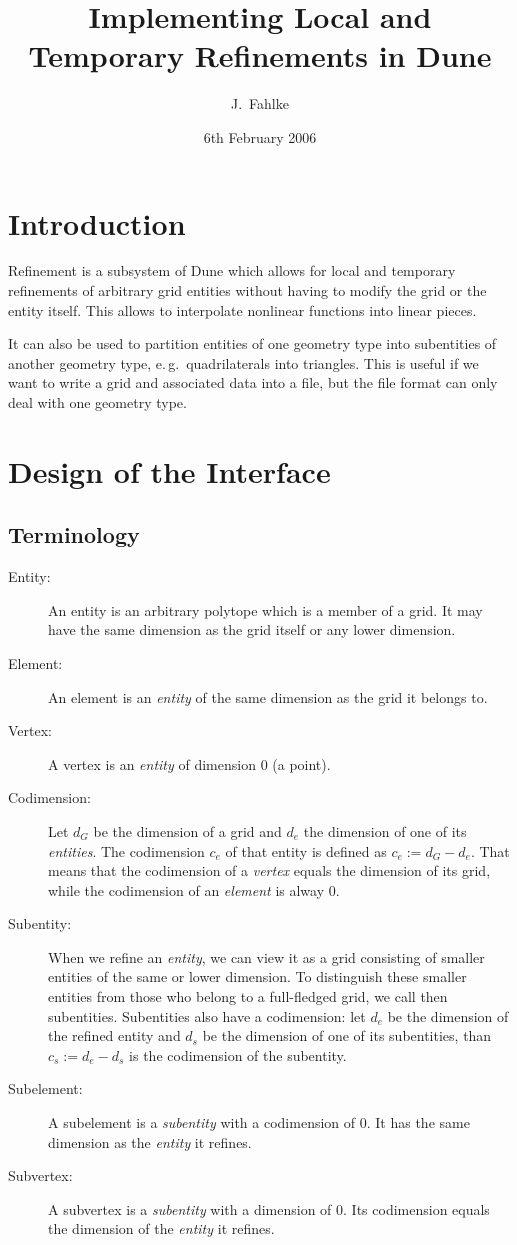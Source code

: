 \documentclass[english,a4paper]{article}
\author{J.~Fahlke}
\title{Implementing Local and Temporary Refinements in Dune}
\date{6th February 2006}
\begin{document}
\maketitle

\section{Introduction}

Refinement is a subsystem of Dune\cite{dune} which allows for local
and temporary refinements of arbitrary grid entities without having to
modify the grid or the entity itself.  This allows to interpolate
nonlinear functions into linear pieces.

It can also be used to partition entities of one geometry type into
subentities of another geometry type, e.\,g.\ quadrilaterals into
triangles.  This is useful if we want to write a grid and associated
data into a file, but the file format can only deal with one geometry
type.

\section{Design of the Interface}

\subsection{Terminology}

\begin{description}
\item[Entity:] An entity is an arbitrary polytope which is a member of
  a grid.  It may have the same dimension as the grid itself or any
  lower dimension.
\item[Element:] An element is an {\em entity} of the same dimension as
  the grid it belongs to.
\item[Vertex:] A vertex is an {\em entity} of dimension 0 (a point).
\item[Codimension:] Let $d_G$ be the dimension of a grid and $d_e$ the
  dimension of one of its {\em entities}.  The codimension $c_e$ of that
  entity is defined as $c_e:=d_G-d_e$.  That means that the
  codimension of a {\em vertex} equals the dimension of its grid,
  while the codimension of an {\em element} is alway 0.
\item[Subentity:] When we refine an {\em entity}, we can view it as a
  grid consisting of smaller entities of the same or lower dimension.
  To distinguish these smaller entities from those who belong to a
  full-fledged grid, we call then subentities.  Subentities also have
  a codimension: let $d_e$ be the dimension of the refined entity and
  $d_s$ be the dimension of one of its subentities, than $c_s:=d_e-d_s$
  is the codimension of the subentity.
\item[Subelement:] A subelement is a {\em subentity} with a
  codimension of 0.  It has the same dimension as the {\em entity} it
  refines.
\item[Subvertex:] A subvertex is a {\em subentity} with a dimension of
  0.  Its codimension equals the dimension of the {\em entity} it
  refines.
\end{description}
\end{document}
